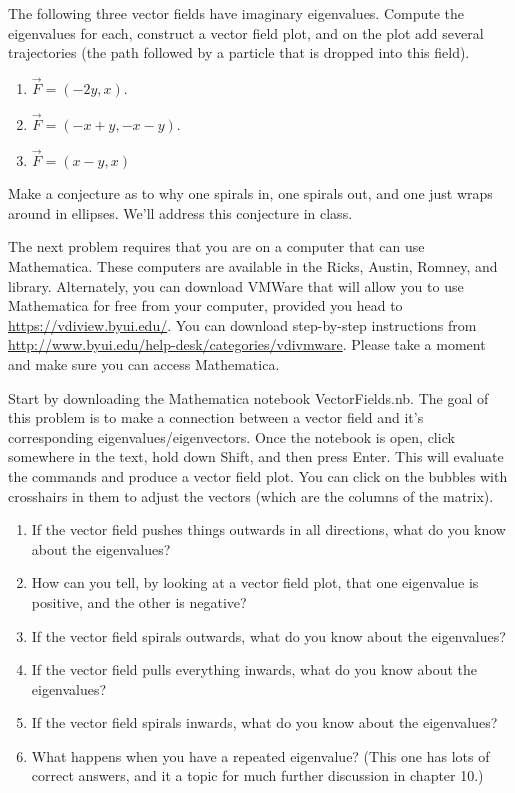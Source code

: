 \begin{problem}
The following three vector fields have imaginary eigenvalues. Compute the eigenvalues for each, construct a vector field plot, and on the plot add several trajectories (the path followed by a particle that is dropped into this field).
\begin{enumerate}
 \item $\vec F = (-2y,x)$. 
 \item $\vec F = (-x+y, -x-y)$.
 \item $\vec F = (x-y, x)$ 
\end{enumerate}
Make a conjecture as to why one spirals in, one spirals out, and one just wraps around in ellipses. We'll address this conjecture in class.
\end{problem}

The next problem requires that you are on a computer that can use Mathematica. These computers are available in the Ricks, Austin, Romney, and library.  Alternately, you can download VMWare that will allow you to use Mathematica for free from your computer, provided you head to \url{https://vdiview.byui.edu/}. You can download step-by-step instructions from \url{http://www.byui.edu/help-desk/categories/vdivmware}. Please take a moment and make sure you can access Mathematica.

\begin{problem}
Start by downloading the Mathematica notebook VectorFields.nb.  The goal of this problem is to make a connection between a vector field and it's corresponding eigenvalues/eigenvectors. Once the notebook is open, click somewhere in the text, hold down Shift, and then press Enter.  This will evaluate the commands and produce a vector field plot. You can click on the bubbles with crosshairs in them to adjust the vectors (which are the columns of the matrix).
 \begin{enumerate}
  \item If the vector field pushes things outwards in all directions, what do you know about the eigenvalues?
  \item How can you tell, by looking at a vector field plot, that one eigenvalue is positive, and the other is negative?
  \item If the vector field spirals outwards, what do you know about the eigenvalues?
  \item If the vector field pulls everything inwards, what do you know about the eigenvalues?
  \item If the vector field spirals inwards, what do you know about the eigenvalues?
  \item What happens when you have a repeated eigenvalue? (This one has lots of correct answers, and it a topic for much further discussion in chapter 10.)
 \end{enumerate}
\end{problem}



